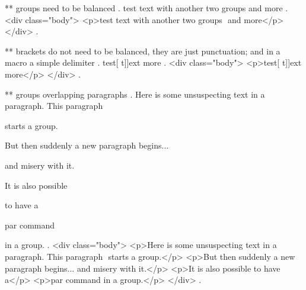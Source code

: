 ** groups need to be balanced
.
test {text with {{another }two} groups } and more
.
<div class="body">
<p>test text with another two​ groups ​ and more</p>
</div>
.


** brackets do not need to be balanced, they are just punctuation; and in a macro a simple delimiter
.
test[ {t]]ext} more
.
<div class="body">
<p>test[ t]]ext​ more</p>
</div>
.


** groups overlapping paragraphs
.
Here is some unsuspecting text in a paragraph. This paragraph { starts a group.

But then suddenly a new paragraph begins... } and misery with it.

It is also possible {to have a\par par command} in a group.
.
<div class="body">
<p>Here is some unsuspecting text in a paragraph. This paragraph ​ starts a group.</p>
<p>But then suddenly a new paragraph begins... ​ and misery with it.</p>
<p>It is also possible to have a</p>
<p>par command​ in a group.</p>
</div>
.
